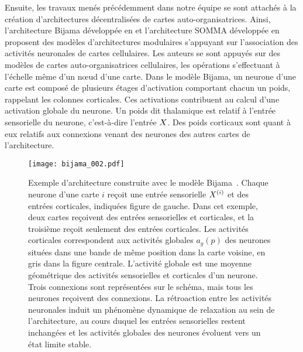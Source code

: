 \documentclass[../main]{subfiles}
\begin{document}
Ensuite, les travaux menés précédemment dans notre équipe se sont attachés à la création d'architectures décentralisées de cartes auto-organisatrices.
Ainsi, l'architecture Bijama développée en \cite{menard05} et l'architecture SOMMA développée en \cite{lefort_unlearning_2011} proposent des modèles d'architectures modulaires s'appuyant sur l'association des activités neuronales de cartes cellulaires.
Les auteurs se sont appuyés sur des modèles de cartes auto-organisatrices cellulaires, les opérations s'effectuant à l'échelle même d'un n\oe{}ud d'une carte.
Dans le modèle Bijama, un neurone d'une carte est composé de plusieurs étages d'activation comportant chacun un poids, rappelant les colonnes corticales. Ces activations contribuent au calcul d'une activation globale du neurone.
Un poids dit thalamique est relatif à l'entrée sensorielle du neurone, c'est-à-dire l'entrée $X$.
Des poids corticaux sont quant à eux relatifs aux connexions venant des neurones des autres cartes de l'architecture.

\begin{figure}
    \centering
    \texttt{[image: bijama\_002.pdf]}
    \caption{Exemple d'architecture construite avec le modèle Bijama~\parencite{menard05}.
    Chaque neurone d'une carte $i$ reçoit une entrée sensorielle $X^{({i})}$ et des entrées corticales, indiquées figure de gauche.
    Dans cet exemple, deux cartes reçoivent des entrées sensorielles et corticales, et la troisième reçoit seulement des entrées corticales.
    Les activités corticales correspondent aux activités globales $a_g(p)$ des neurones situées dans une bande de même position dans la carte voisine, en gris dans la figure centrale. L'activité globale est une moyenne géométrique des activités sensorielles et corticales d'un neurone.
    Trois connexions sont représentées sur le schéma, mais tous les neurones reçoivent des connexions.
    La rétroaction entre les activités neuronales induit un phénomène dynamique de relaxation au sein de l'architecture, au cours duquel les entrées sensorielles restent inchangées et les activités globales des neurones évoluent vers un état limite stable. \label{fig:bijama}}
\end{figure}
\end{document}
